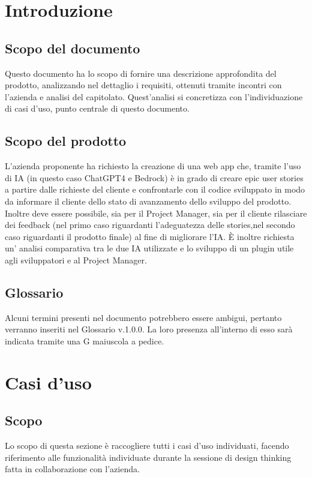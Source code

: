 \documentclass{article}
\begin{document}
\section*{Introduzione}

\subsection*{Scopo del documento}

Questo documento ha lo scopo di fornire una descrizione approfondita del prodotto, analizzando nel dettaglio i requisiti, ottenuti tramite incontri con l'azienda e analisi del capitolato. Quest'analisi si concretizza con l'individuazione di casi d'uso, punto centrale di questo documento.


\subsection*{Scopo del prodotto}
L'azienda proponente ha richiesto la creazione di una web app che, tramite l'uso di IA (in questo caso ChatGPT4 e Bedrock) è in grado di creare epic user stories a partire dalle richieste del cliente e confrontarle con il codice sviluppato in modo da informare il cliente dello stato di avanzamento dello sviluppo del prodotto. Inoltre deve essere possibile, sia per il Project Manager, sia per il cliente rilasciare dei feedback (nel primo caso riguardanti l'adeguatezza delle stories,nel secondo caso riguardanti il prodotto finale) al fine di migliorare l'IA. È inoltre richiesta un' analisi comparativa tra le due IA utilizzate e lo sviluppo di un plugin utile agli sviluppatori e al Project Manager.

\subsection*{Glossario}
Alcuni termini presenti nel documento potrebbero essere ambigui, pertanto verranno inseriti nel Glossario v.1.0.0. La loro presenza all'interno di esso sarà indicata tramite una G maiuscola a pedice.

\section*{Casi d'uso}
\subsection*{Scopo}
Lo scopo di questa sezione è raccogliere tutti i casi d'uso individuati, facendo riferimento alle funzionalità individuate durante la sessione di design thinking fatta in collaborazione con l'azienda.
\end{document}
